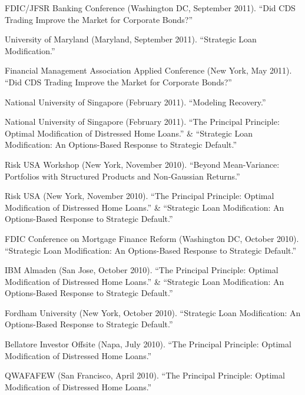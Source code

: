 \documentclass{article}
\begin{document}
\begin{etaremune}
{\item FDIC/JFSR Banking Conference (Washington DC, September 2011). 
``Did CDS Trading Improve the Market for Corporate Bonds?''

\item University of Maryland (Maryland, September 2011). 
``Strategic Loan Modification.''

\item Financial Management Association Applied Conference (New York, May 2011). 
``Did CDS Trading Improve the Market for Corporate Bonds?''

\item National University of Singapore (February 2011). 
``Modeling Recovery.''

\item National University of Singapore (February 2011). 
``The Principal Principle: Optimal Modification of Distressed Home Loans.'' \& ``Strategic Loan Modification: An Options-Based Response to Strategic Default.''

\item Risk USA Workshop (New York, November 2010). 
``Beyond Mean-Variance: Portfolios with Structured Products  and Non-Gaussian Returns.''

\item Risk USA (New York, November 2010). 
``The Principal Principle: Optimal Modification of Distressed Home Loans.'' \& ``Strategic Loan Modification: An Options-Based Response to Strategic Default.''

\item FDIC Conference on Mortgage Finance Reform (Washington DC, October 2010). 
``Strategic Loan Modification: An Options-Based Response to Strategic Default.''

\item IBM Almaden (San Jose, October 2010). 
``The Principal Principle: Optimal Modification of Distressed Home Loans.'' \& ``Strategic Loan Modification: An Options-Based Response to Strategic Default.''

\item Fordham University (New York, October 2010). 
``Strategic Loan Modification: An Options-Based Response to Strategic Default.''

\item Bellatore Investor Offsite (Napa, July 2010).
``The Principal Principle: Optimal Modification of Distressed Home Loans.''

\item QWAFAFEW (San Francisco, April 2010).
``The Principal Principle: Optimal Modification of Distressed Home Loans.''

}
\end{etaremune}
\end{document}
